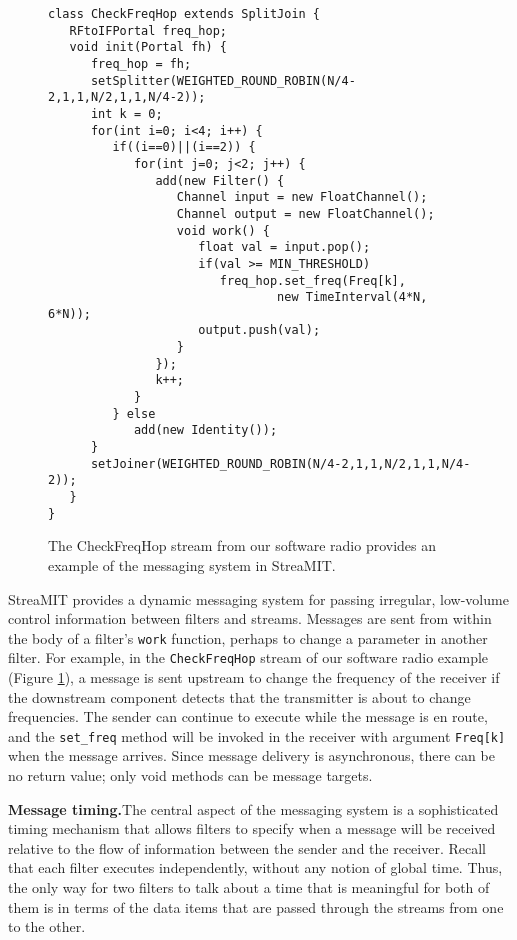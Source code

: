 \begin{figure}
\scriptsize
\begin{verbatim}
class CheckFreqHop extends SplitJoin {
   RFtoIFPortal freq_hop;
   void init(Portal fh) {
      freq_hop = fh;
      setSplitter(WEIGHTED_ROUND_ROBIN(N/4-2,1,1,N/2,1,1,N/4-2));
      int k = 0;
      for(int i=0; i<4; i++) {
         if((i==0)||(i==2)) {
            for(int j=0; j<2; j++) {
               add(new Filter() {
                  Channel input = new FloatChannel();
                  Channel output = new FloatChannel();
                  void work() {
                     float val = input.pop();
                     if(val >= MIN_THRESHOLD) 
                        freq_hop.set_freq(Freq[k], 
                                new TimeInterval(4*N, 6*N)); 
                     output.push(val);
                  }
               });
               k++;
            }
         } else
            add(new Identity());
      }
      setJoiner(WEIGHTED_ROUND_ROBIN(N/4-2,1,1,N/2,1,1,N/4-2));
   }
}
\end{verbatim}
\vspace{-12pt}
\caption{\protect\small The CheckFreqHop stream from our software
   radio provides an example of the messaging system in StreaMIT.
\protect\label{fig:mess}}
\vspace{-12pt}
\end{figure}

StreaMIT provides a dynamic messaging system for passing irregular,
low-volume control information between filters and streams.  Messages
are sent from within the body of a filter's {\tt work} function,
perhaps to change a parameter in another filter.  For example, in the
{\tt CheckFreqHop} stream of our software radio example (Figure
\ref{fig:mess}), a message is sent upstream to change the frequency of
the receiver if the downstream component detects that the transmitter
is about to change frequencies.  The sender can continue to execute
while the message is en route, and the {\tt set\_freq} method will be
invoked in the receiver with argument {\tt Freq[k]} when the message
arrives.  Since message delivery is asynchronous, there can be no
return value; only void methods can be message targets.

{\bf Message timing.}The central aspect of the messaging system is a
sophisticated timing mechanism that allows filters to specify when a
message will be received relative to the flow of information between
the sender and the receiver.  Recall that each filter executes
independently, without any notion of global time.  Thus, the only way
for two filters to talk about a time that is meaningful for both of
them is in terms of the data items that are passed through the streams
from one to the other.


